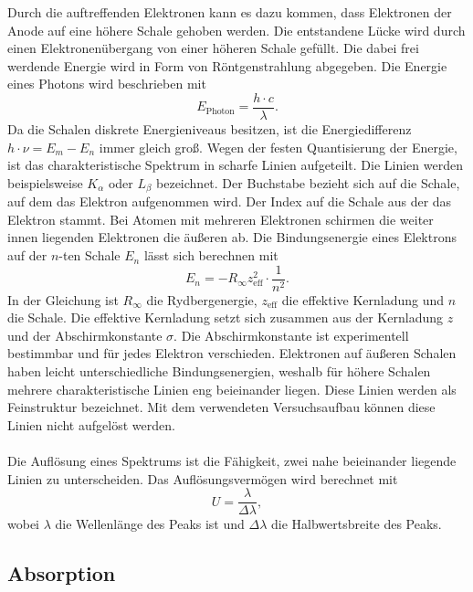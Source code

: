 Durch die auftreffenden Elektronen kann es dazu kommen, dass Elektronen der Anode auf eine höhere Schale 
gehoben werden. Die entstandene Lücke wird durch einen Elektronenübergang von einer höheren Schale gefüllt.
Die dabei frei werdende Energie wird in Form von Röntgenstrahlung abgegeben. Die Energie eines Photons wird beschrieben mit
\begin{equation}\label{eq:Energie_Photon}
    E_{\text{Photon}} = \frac{h\cdot c}{\lambda}.
\end{equation}
Da die Schalen diskrete Energieniveaus besitzen,
ist die Energiedifferenz $h \cdot ν = E_m - E_n$ immer gleich groß. Wegen der festen Quantisierung der Energie,
ist das charakteristische Spektrum in scharfe Linien aufgeteilt.
Die Linien werden beispielsweise $K_α$ oder $L_β$ bezeichnet. Der Buchstabe bezieht sich auf die 
Schale, auf dem das Elektron aufgenommen wird. Der Index auf die Schale aus der das Elektron stammt.
Bei Atomen mit mehreren Elektronen schirmen die weiter innen liegenden Elektronen die äußeren ab.
Die Bindungsenergie eines Elektrons auf der $n$-ten Schale $E_n$ lässt sich berechnen mit
\begin{equation*}\label{eq:Bindungsenergie}
    E_n = -R_\infty z_{\text{eff}}^2 \cdot \frac{1}{n^2}.
\end{equation*}
In der Gleichung ist $R_\infty$ die Rydbergenergie, $z_{\text{eff}}$ die effektive Kernladung und $n$ die Schale.
Die effektive Kernladung setzt sich zusammen aus der Kernladung $z$ und der Abschirmkonstante $σ$.
Die Abschirmkonstante ist experimentell bestimmbar und für jedes Elektron verschieden.
Elektronen auf äußeren Schalen haben leicht unterschiedliche Bindungsenergien, weshalb für höhere Schalen
mehrere charakteristische Linien eng beieinander liegen. Diese Linien werden als Feinstruktur bezeichnet. Mit dem verwendeten Versuchsaufbau können diese Linien nicht aufgelöst werden.\\
\\
Die Auflösung eines Spektrums ist die Fähigkeit, zwei nahe beieinander liegende Linien zu unterscheiden. 
Das Auflösungsvermögen wird berechnet mit
\begin{equation}\label{eq:Spektrales_Aufloesungsvermoegen}
    U = \frac{λ}{Δλ},
\end{equation}
wobei $λ$ die Wellenlänge des Peaks ist und $Δλ$ die Halbwertsbreite des Peaks.\\

\subsection{Absorption}
\label{sec:Absorption}

